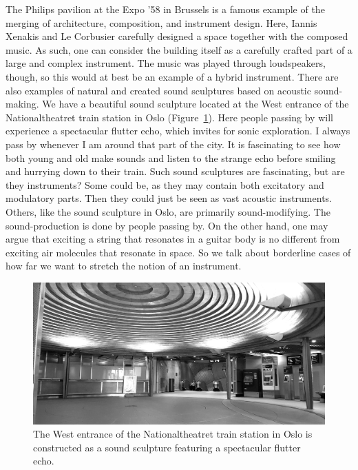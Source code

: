 The Philips pavilion at the Expo '58 in Brussels is a famous example of the merging of architecture, composition, and instrument design. Here, Iannis Xenakis and Le Corbusier carefully designed a space together with the composed music. As such, one can consider the building itself as a carefully crafted part of a large and complex instrument. The music was played through loudspeakers, though, so this would at best be an example of a hybrid instrument. There are also examples of natural and created sound sculptures  based on acoustic sound-making. We have a beautiful sound sculpture located at the West entrance of the Nationaltheatret train station in Oslo (Figure~\ref{fig:nationaltheatret}). Here people passing by will experience a spectacular flutter echo, which invites for sonic exploration. I always pass by whenever I am around that part of the city. It is fascinating to see how both young and old make sounds and listen to the strange echo before smiling and hurrying down to their train. Such sound sculptures are fascinating, but are they instruments? Some could be, as they may contain both excitatory and modulatory parts. Then they could just be seen as vast acoustic instruments. Others, like the sound sculpture in Oslo, are primarily sound-modifying. The sound-production is done by people passing by. On the other hand, one may argue that exciting a string that resonates in a guitar body is no different from exciting air molecules that resonate in space. So we talk about borderline cases of how far we want to stretch the notion of an instrument.

\begin{figure}[tp]
      \includegraphics[width=\columnwidth]{figures/45-nationaltheatret.jpg}
      \caption{The West entrance of the Nationaltheatret train station in Oslo is constructed as a sound sculpture featuring a spectacular flutter echo.}
            \label{fig:nationaltheatret}
\end{figure}



